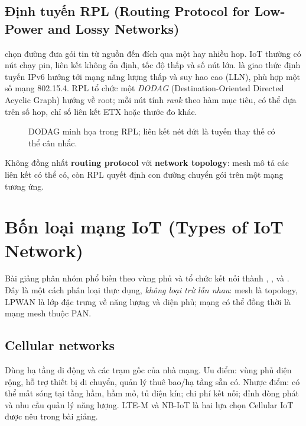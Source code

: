 \subsection{Định tuyến RPL (Routing Protocol for Low-Power and Lossy Networks)}
 chọn đường đưa gói tin từ nguồn đến đích qua một hay nhiều hop. IoT thường có nút chạy pin, liên kết không ổn định, tốc độ thấp và số nút lớn.  là giao thức định tuyến IPv6 hướng tới mạng năng lượng thấp và suy hao cao (LLN), phù hợp một số mạng 802.15.4. RPL tổ chức một \emph{DODAG} (Destination-Oriented Directed Acyclic Graph) hướng về root; mỗi nút tính \emph{rank} theo hàm mục tiêu, có thể dựa trên số hop, chỉ số liên kết ETX hoặc thước đo khác.
\begin{figure}[htbp]\centering
{}\caption{DODAG minh họa trong RPL; liên kết nét đứt là tuyến thay thế có thể cân nhắc.}
\end{figure}
\begin{keybox}Không đồng nhất \textbf{routing protocol} với \textbf{network topology}: mesh mô tả các liên kết có thể có, còn RPL quyết định con đường chuyển gói trên một mạng tương ứng.\end{keybox}
\section{Bốn loại mạng IoT (Types of IoT Network)}
Bài giảng phân nhóm phổ biến theo vùng phủ và tổ chức kết nối thành , ,  và . Đây là một cách phân loại thực dụng, \emph{không loại trừ lẫn nhau}: mesh là topology, LPWAN là lớp đặc trưng về năng lượng và diện phủ; mạng có thể đồng thời là mạng mesh thuộc PAN.
\subsection{Cellular networks}
Dùng hạ tầng di động và các trạm gốc của nhà mạng. Ưu điểm: vùng phủ diện rộng, hỗ trợ thiết bị di chuyển, quản lý thuê bao/hạ tầng sẵn có. Nhược điểm: có thể mất sóng tại tầng hầm, hầm mỏ, tủ điện kín; chi phí kết nối; đỉnh dòng phát và nhu cầu quản lý năng lượng. LTE-M và NB-IoT là hai lựa chọn Cellular IoT được nêu trong bài giảng.
